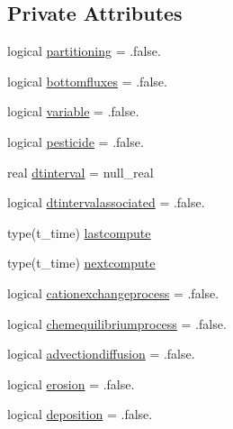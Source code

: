 \subsection*{Private Attributes}
\begin{DoxyCompactItemize}
\item 
logical \mbox{\hyperlink{structmodulerunoffproperties_1_1t__evolution_a93996703fe5864f603fd215ece23baae}{partitioning}} = .false.
\item 
logical \mbox{\hyperlink{structmodulerunoffproperties_1_1t__evolution_a894f08f6a62c0ac38d021b3cf729efb7}{bottomfluxes}} = .false.
\item 
logical \mbox{\hyperlink{structmodulerunoffproperties_1_1t__evolution_a4419f4ea01644d2f20616674452527ed}{variable}} = .false.
\item 
logical \mbox{\hyperlink{structmodulerunoffproperties_1_1t__evolution_a436e0ba717750f46a0fd75a26b531967}{pesticide}} = .false.
\item 
real \mbox{\hyperlink{structmodulerunoffproperties_1_1t__evolution_a065991dfaabb2c1fd5929f05ea365a6b}{dtinterval}} = null\+\_\+real
\item 
logical \mbox{\hyperlink{structmodulerunoffproperties_1_1t__evolution_ad90b4b327378f0a3cf4f58fefa01aea5}{dtintervalassociated}} = .false.
\item 
type(t\+\_\+time) \mbox{\hyperlink{structmodulerunoffproperties_1_1t__evolution_af77e9ad614b4bd066d8a2acb163c280b}{lastcompute}}
\item 
type(t\+\_\+time) \mbox{\hyperlink{structmodulerunoffproperties_1_1t__evolution_a49872b5346003588aaa54a9c507264e1}{nextcompute}}
\item 
logical \mbox{\hyperlink{structmodulerunoffproperties_1_1t__evolution_aa6f621b69549ed2461111b859354ccf8}{cationexchangeprocess}} = .false.
\item 
logical \mbox{\hyperlink{structmodulerunoffproperties_1_1t__evolution_a9e5b9d5eb9c10dcb8034d518658692ea}{chemequilibriumprocess}} = .false.
\item 
logical \mbox{\hyperlink{structmodulerunoffproperties_1_1t__evolution_a420382db797df3beab3a0bd68836df9d}{advectiondiffusion}} = .false.
\item 
logical \mbox{\hyperlink{structmodulerunoffproperties_1_1t__evolution_a41a59c60fbf4c1ca65e1fb268df55b72}{erosion}} = .false.
\item 
logical \mbox{\hyperlink{structmodulerunoffproperties_1_1t__evolution_a7d077b4b728b9810964c0c181efc3391}{deposition}} = .false.
\item 

\end{DoxyCompactItemize}
